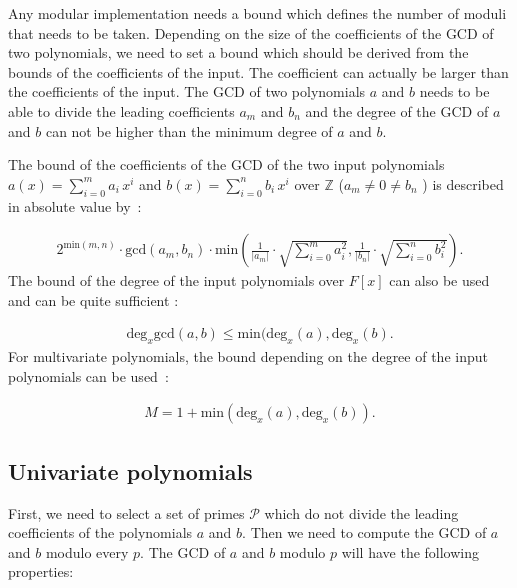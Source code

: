 Any modular implementation needs a bound which defines the number of moduli that needs to be taken. 
Depending on the size of the coefficients of the GCD of two polynomials, we need to set a bound which should be derived from the bounds of the coefficients of the input. The coefficient can actually be larger than the coefficients of the input. The GCD of two polynomials $a$ and $b$ needs to be able to divide the leading coefficients $a_m$ and $b_n$ and the degree of the GCD of $a$ and $b$ can not be higher than the minimum degree of $a$ and $b$. 

The bound of the coefficients of the GCD of the two input polynomials \mbox{$a(x) = \sum_{i=0}^m a_i \, x^i$} and \mbox{$b(x) = \sum_{i=0}^n b_i \, x^i$} over $\mathbb{Z}$ ($a_m \neq 0 \neq b_n$ ) is described in absolute value by~\cite{winkler1996}:

\begin{align}
2^{\text{min}(m,n)} \cdot \text{gcd}(a_m, b_n) \cdot \text{min}\left(\frac{1}{|a_m|} \cdot \sqrt{\sum_{i=0}^m a_i^2}, \frac{1}{|b_n|} \cdot \sqrt{\sum_{i=0}^n b_i^2}\right).
\end{align}The bound of the degree of the input polynomials over $F[x]$ can also be used and can be quite sufficient \cite{modernComputerAlgebra}:

\begin{align}
\text{deg}_x \text{gcd}(a, b) \leq \text{min}(\text{deg}_x(a), \text{deg}_x(b).
\end{align}For multivariate polynomials, the bound depending on the degree of the input polynomials can be used~\cite{winkler1996}:

\begin{align}
M = 1 + \text{min}(\text{deg}_x(a), \text{deg}_x(b)).
\end{align}

\subsection{Univariate polynomials}

First, we need to select a set of primes $\mathcal{P}$ which do not divide the leading coefficients of the polynomials $a$ and $b$. Then we need to compute the GCD of $a$ and $b$ modulo every $p$. The GCD of $a$ and $b$ modulo $p$ will have the following properties:

